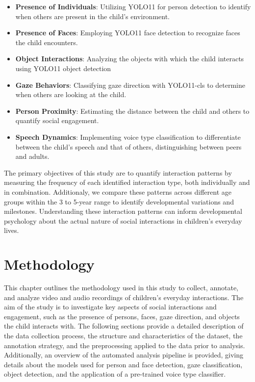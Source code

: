 \documentclass[
  man,floatsintext]{apa6}
\providecommand{\tightlist}{%
  \setlength{\itemsep}{0pt}\setlength{\parskip}{0pt}}
\begin{document}
\begin{itemize}
\tightlist
\item
  \textbf{Presence of Individuals}: Utilizing YOLO11 for person detection to identify when others are present in the child's environment.
\item
  \textbf{Presence of Faces}: Employing YOLO11 face detection to recognize faces the child encounters.
\item
  \textbf{Object Interactions}: Analyzing the objects with which the child interacts using YOLO11 object detection
\item
  \textbf{Gaze Behaviors}: Classifying gaze direction with YOLO11-cls to determine when others are looking at the child.
\item
  \textbf{Person Proximity}: Estimating the distance between the child and others to quantify social engagement.
\item
  \textbf{Speech Dynamics}: Implementing voice type classification to differentiate between the child's speech and that of others, distinguishing between peers and adults.
\end{itemize}

The primary objectives of this study are to quantify interaction patterns by measuring the frequency of each identified interaction type, both individually and in combination. Additionaly, we compare these patterns across different age groups within the 3 to 5-year range to identify developmental variations and milestones. Understanding these interaction patterns can inform developmental psychology about the actual nature of social interactions in children's everyday lives.

\section{Methodology}\label{methodology}

This chapter outlines the methodology used in this study to collect, annotate, and analyze video and audio recordings of children's everyday interactions. The aim of the study is to investigate key aspects of social interactions and engagement, such as the presence of persons, faces, gaze direction, and objects the child interacts with. The following sections provide a detailed description of the data collection process, the structure and characteristics of the dataset, the annotation strategy, and the preprocessing applied to the data prior to analysis. Additionally, an overview of the automated analysis pipeline is provided, giving details about the models used for person and face detection, gaze classification, object detection, and the application of a pre-trained voice type classifier.
\end{document}
